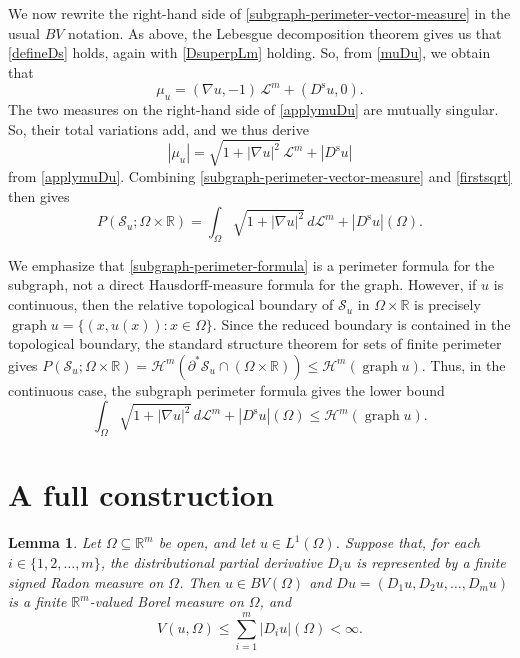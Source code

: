 \documentclass[10pt,a4paper]{amsart}
\newtheorem{lemma}{Lemma}%
\begin{document}
We now rewrite the right-hand side of
\eqref{subgraph-perimeter-vector-measure} in the usual \(BV\) notation. As above, the
Lebesgue decomposition theorem gives us that \eqref{defineDs} holds, 
 again with \eqref{DsuperpLm} holding. 
 So, from \eqref{muDu}, we obtain that 
\begin{equation}\label{applymuDu}
\mu_u
=
(\nabla u,-1)\,\mathcal L^m
+
(D^{\operatorname{s}}u,0).
\end{equation}
 The two measures on the right-hand side of \eqref{applymuDu} are mutually singular. So, 
their total variations add, and we thus derive 
\begin{equation}\label{firstsqrt}
 |\mu_u|
=
\sqrt{1+|\nabla u|^2}\,\mathcal L^m
+
|D^{\operatorname{s}}u| 
\end{equation}
 from \eqref{applymuDu}. 
Combining \eqref{subgraph-perimeter-vector-measure} and \eqref{firstsqrt} then gives
\begin{equation}\label{subgraph-perimeter-formula}
P(\mathcal S_u;\Omega\times\mathbb R)
=
\int_{\Omega}\sqrt{1+|\nabla u|^2}\,d\mathcal L^m
+
|D^{\operatorname{s}}u|(\Omega).
\end{equation}

 We emphasize that \eqref{subgraph-perimeter-formula} is a perimeter formula for the subgraph, not a direct Hausdorff-measure formula for the graph. However, if $u$ is continuous, then 
 the relative topological boundary of
\(\mathcal S_u\) in \(\Omega\times\mathbb R\) is precisely 
 $
\operatorname{graph}u
=
\{(x,u(x)):x\in\Omega\}$. 
Since the reduced boundary is contained in the topological boundary, the
standard structure theorem for sets of finite perimeter gives
$
P(\mathcal S_u;\Omega\times\mathbb R)
=
\mathcal H^m(\partial^*\mathcal S_u\cap(\Omega\times\mathbb R))
\leq
\mathcal H^m(\operatorname{graph}u)$. 
Thus, in the continuous case, the subgraph perimeter formula gives the lower
bound
\begin{equation}\label{subgraph-lower-bound-graph}
\int_{\Omega}\sqrt{1+|\nabla u|^2}\,d\mathcal L^m
+
|D^{\operatorname{s}}u|(\Omega)
\leq
\mathcal H^m(\operatorname{graph}u).
\end{equation}

\section{A full construction}\label{secfull}

\begin{lemma}\label{lem:finite-partials-imply-BV}%
Let \(\Omega\subseteq\mathbb R^m\) be open, and let \(u\in L^1(\Omega)\).
Suppose that, for each \(i\in\{1,2,\ldots,m\}\), the distributional partial
derivative \(D_i u\) is represented by a finite signed Radon measure on
\(\Omega\). Then \(u\in BV(\Omega)\) and 
$
Du=(D_1u,D_2u,\ldots,D_m u)
$ 
is a finite \(\mathbb R^m\)-valued Borel measure on \(\Omega\), and
\[
V(u,\Omega)\leq \sum_{i=1}^m |D_i u|(\Omega)<\infty.
\]
\end{lemma}
\end{document}
